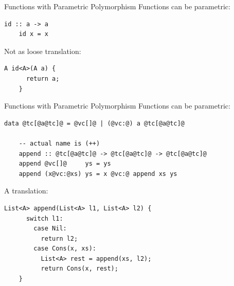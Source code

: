 \documentclass[xcolor={usenames,dvipsnames}]{beamer}
\begin{document}
%

\begin{frame}[fragile]{Functions with Parametric Polymorphism}
  Functions can be parametric:
  \begin{lstlisting}[style=hask]
    id :: a -> a
    id x = x
  \end{lstlisting}

  Not as loose translation:
  \begin{lstlisting}[style=hask]
    A id<A>(A a) {
      return a;
    }
  \end{lstlisting}
\end{frame}

\begin{frame}[fragile]{Functions with Parametric Polymorphism}
  Functions can be parametric:
  \begin{lstlisting}[style=hask]
    data @tc[@a@tc]@ = @vc[]@ | (@vc:@) a @tc[@a@tc]@

    -- actual name is (++)
    append :: @tc[@a@tc]@ -> @tc[@a@tc]@ -> @tc[@a@tc]@
    append @vc[]@     ys = ys
    append (x@vc:@xs) ys = x @vc:@ append xs ys
  \end{lstlisting}

  A translation:
  \begin{lstlisting}[style=hask]
    List<A> append(List<A> l1, List<A> l2) {
      switch l1:
        case Nil:
          return l2;
        case Cons(x, xs):
          List<A> rest = append(xs, l2);
          return Cons(x, rest);
    }
  \end{lstlisting}
\end{frame}
\end{document}
